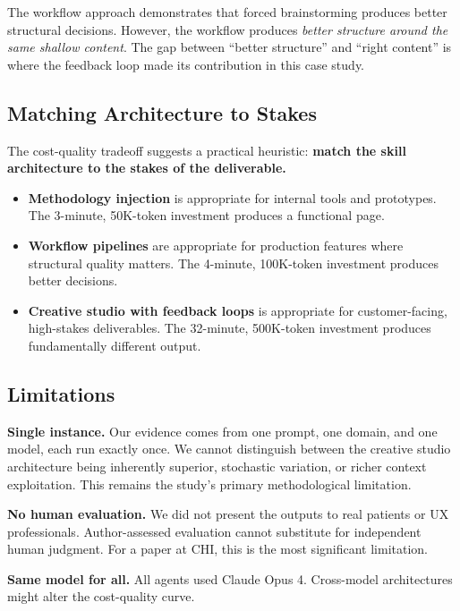 \documentclass[conference]{IEEEtran}
\providecommand{\tightlist}{%
  \setlength{\itemsep}{0pt}\setlength{\parskip}{0pt}}
\begin{document}
The workflow approach demonstrates that forced brainstorming produces better structural decisions. However, the workflow produces \emph{better structure around the same shallow content}. The gap between ``better structure'' and ``right content'' is where the feedback loop made its contribution in this case study.

\subsection{Matching Architecture to Stakes}\label{matching-architecture-to-stakes}

The cost-quality tradeoff suggests a practical heuristic: \textbf{match the skill architecture to the stakes of the deliverable.}

\begin{itemize}
\tightlist
\item
  \textbf{Methodology injection} is appropriate for internal tools and prototypes. The 3-minute, 50K-token investment produces a functional page.
\item
  \textbf{Workflow pipelines} are appropriate for production features where structural quality matters. The 4-minute, 100K-token investment produces better decisions.
\item
  \textbf{Creative studio with feedback loops} is appropriate for customer-facing, high-stakes deliverables. The 32-minute, 500K-token investment produces fundamentally different output.
\end{itemize}

\subsection{Limitations}\label{limitations}

\textbf{Single instance.} Our evidence comes from one prompt, one domain, and one model, each run exactly once. We cannot distinguish between the creative studio architecture being inherently superior, stochastic variation, or richer context exploitation. This remains the study's primary methodological limitation.

\textbf{No human evaluation.} We did not present the outputs to real patients or UX professionals. Author-assessed evaluation cannot substitute for independent human judgment. For a paper at CHI, this is the most significant limitation.

\textbf{Same model for all.} All agents used Claude Opus 4. Cross-model architectures might alter the cost-quality curve.
\end{document}
